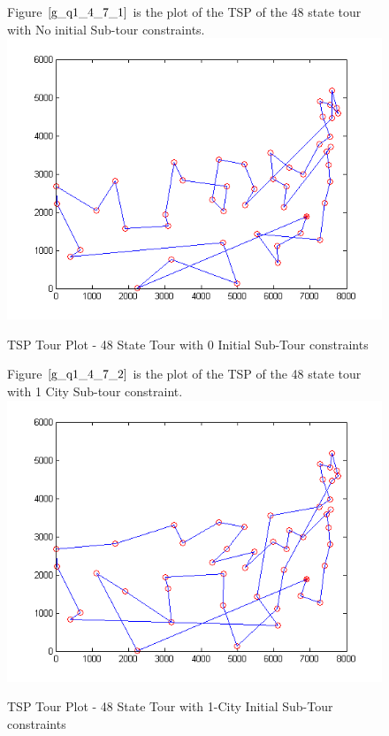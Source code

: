 \documentclass[twoside,12pt]{article}
\begin{document}
\begin{figure}[!htbp]
\centering
Figure $\eqref{g_q1_4_7_1}$ is the plot of the TSP of the 48 state tour with No initial Sub-tour constraints. 
 \includegraphics[scale=1.3]{0_city/all_48_with_0} 
\caption{TSP Tour Plot - 48 State Tour with 0 Initial Sub-Tour constraints}
\label{g_q1_4_7_1}
\end{figure}
\FloatBarrier


\begin{figure}[!htbp]
\centering
Figure $\eqref{g_q1_4_7_2}$ is the plot of the TSP of the 48 state tour with 1 City Sub-tour constraint. 
 \includegraphics[scale=1.3]{1_city/all_48_with_1} 
\caption{TSP Tour Plot - 48 State Tour with 1-City Initial Sub-Tour constraints}
\label{g_q1_4_7_2}
\end{figure}
\FloatBarrier
\end{document}
